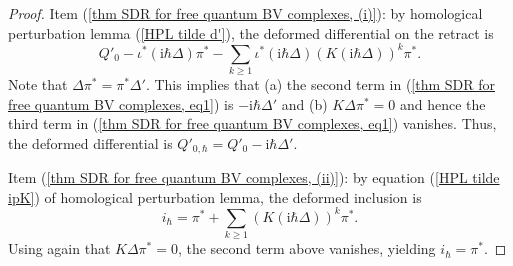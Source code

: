 \documentclass{amsart}
\theoremstyle{plain} %
\theoremstyle{definition}
\theoremstyle{remark}
\newcommand{\iii}{\mathrm{i}}
\begin{document}
\begin{proof}
    Item (\ref{thm SDR for free quantum BV complexes, (i)}): by homological perturbation lemma (\ref{HPL tilde d'}), the deformed differential on the retract is
    \begin{equation}\label{thm SDR for free quantum BV complexes, eq1}
    Q'_0-\iota^* (\iii\hbar \Delta) \pi^*-\sum_{k\geq 1}\iota^* (\iii\hbar \Delta)(K(\iii\hbar \Delta))^k \pi^*.
    \end{equation}
    Note that $\Delta \pi^*=\pi^* \Delta'$. This implies that (a) the second term in (\ref{thm SDR for free quantum BV complexes, eq1}) is $-\iii\hbar \Delta'$ and (b) $K\Delta\pi^*=0$ and hence the third term in (\ref{thm SDR for free quantum BV complexes, eq1}) vanishes. Thus, the deformed differential is $Q'_{0,\hbar}=Q'_0-\iii\hbar\Delta'$.

    Item (\ref{thm SDR for free quantum BV complexes, (ii)}): by equation (\ref{HPL tilde ipK}) of homological perturbation lemma,
    the deformed inclusion is
    \begin{equation}
        i_\hbar=\pi^*+\sum_{k\geq 1}(K(\iii\hbar \Delta))^k \pi^*.
    \end{equation}
    Using again that $K\Delta\pi^*=0$, the second term above vanishes, yielding $i_\hbar=\pi^*$.


\end{proof}
\end{document}
